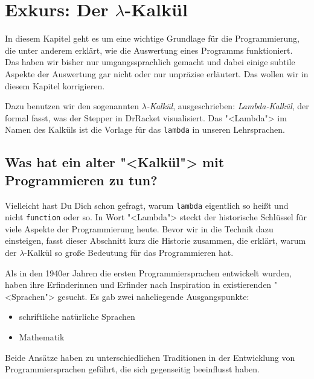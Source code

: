 
\chapter{Exkurs: Der $\lambda$-Kalkül}
\label{chap:lambda}

\newcommand{\lrm}{\mathrm}


In diesem Kapitel geht es um eine wichtige Grundlage
für die Programmierung, die unter anderem erklärt, wie die Auswertung
eines Programms funktioniert.  Das haben wir bisher nur
umgangssprachlich gemacht und dabei einige subtile Aspekte der
Auswertung gar nicht oder nur unpräzise erläutert.  Das wollen wir in
diesem Kapitel korrigieren.

Dazu benutzen wir den sogenannten \textit{$\lambda$-Kalkül},
ausgeschrieben: \textit{Lambda-Kalkül}, der formal fasst, was der
Stepper in DrRacket visualisiert.  Das "<Lambda"> im Namen des Kalküls
ist die Vorlage für das \lstinline{lambda} in unseren Lehrsprachen.

\section{Was hat ein alter "<Kalkül"> mit Programmieren zu tun?}

Vielleicht hast Du Dich schon gefragt, warum \lstinline{lambda}
eigentlich so heißt und nicht \lstinline{function} oder so.  In Wort
"<Lambda"> steckt der historische Schlüssel für viele Aspekte der
Programmierung heute.  Bevor wir in die Technik dazu einsteigen, fasst
dieser Abschnitt kurz die Historie zusammen, die erklärt, warum der
$\lambda$-Kalkül so große Bedeutung für das Programmieren hat.

Als in den 1940er Jahren die ersten Programmiersprachen entwickelt
wurden, haben ihre Erfinderinnen und Erfinder nach Inspiration in
existierenden "<Sprachen"> gesucht.  Es gab zwei naheliegende
Ausgangspunkte:
%
\begin{itemize}
\item schriftliche natürliche Sprachen
\item Mathematik
\end{itemize}
%
Beide Ansätze haben zu unterschiedlichen Traditionen in der
Entwicklung von Programmiersprachen geführt, die sich gegenseitig
beeinflusst haben.

